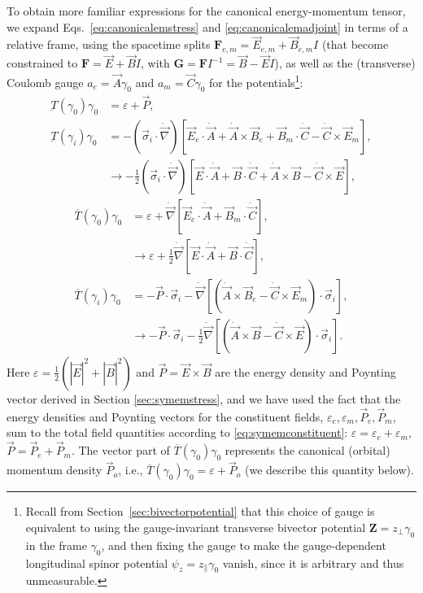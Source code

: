 \documentclass[1p,sort&compress]{elsarticle}
\numberwithin{equation}{section}
\newcommand{\rv}[1]{\vec{#1}}
\newcommand{\bv}[1]{\mathbf{#1}}
\begin{document}
To obtain more familiar expressions for the canonical energy-momentum tensor, we expand Eqs.~\eqref{eq:canonicalemstress} and \eqref{eq:canonicalemadjoint} in terms of a relative frame, using the spacetime splits $\bv{F}_{e,m} = \rv{E}_{e,m} + \rv{B}_{e,m} I$ (that become constrained to $\bv{F} = \rv{E} + \rv{B}I$, with $\bv{G} = \bv{F}I^{-1} = \rv{B} - \rv{E} I$), as well as the (transverse) Coulomb gauge $a_e = \rv{A}\gamma_0$ and $a_m = \rv{C}\gamma_0$ for the potentials\footnote{Recall from Section~\ref{sec:bivectorpotential} that this choice of gauge is equivalent to using the gauge-invariant transverse bivector potential $\bv{Z} = z_\perp\gamma_0$ in the frame $\gamma_0$, and then fixing the gauge to make the gauge-dependent longitudinal spinor potential $\psi_z = z_\parallel\gamma_0$ vanish, since it is arbitrary and thus unmeasurable.}:
\begin{align}\label{eq:emtensorrel}
  \underbar{T}(\gamma_0)\gamma_0 &= \varepsilon + \rv{P}, \\
 \underbar{T}(\gamma_i)\gamma_0 &= -(\rv{\sigma}_i\cdot\dot{\rv{\nabla}})\left[\rv{E}_e\cdot\dot{\rv{A}} + \dot{\rv{A}}\times\rv{B}_e + \rv{B}_m\cdot\dot{\rv{C}} - \dot{\rv{C}}\times\rv{E}_m\right], \nonumber \\
 &\to -\frac{1}{2}(\rv{\sigma}_i\cdot\dot{\rv{\nabla}})\left[\rv{E}\cdot\dot{\rv{A}} + \rv{B}\cdot\dot{\rv{C}} + \dot{\rv{A}}\times\rv{B} - \dot{\rv{C}}\times\rv{E}\right], \nonumber 
\end{align}
\begin{align}\label{eq:emadjointrel}
  \overline{T}(\gamma_0)\gamma_0 &= \varepsilon + \dot{\rv{\nabla}}\left[\rv{E}_e\cdot\dot{\rv{A}} + \rv{B}_m\cdot\dot{\rv{C}}\right], \\
  &\to \varepsilon + \frac{1}{2}\dot{\rv{\nabla}}\left[\rv{E}\cdot\dot{\rv{A}} + \rv{B}\cdot\dot{\rv{C}}\right], \nonumber\\
  \overline{T}(\gamma_i)\gamma_0 &= -\rv{P}\cdot\rv{\sigma}_i - \dot{\rv{\nabla}}\left[(\dot{\rv{A}}\times\rv{B}_e - \dot{\rv{C}}\times\rv{E}_m)\cdot\rv{\sigma}_i\right], \nonumber \\
  &\to -\rv{P}\cdot\rv{\sigma}_i - \frac{1}{2}\dot{\rv{\nabla}}\left[(\dot{\rv{A}}\times\rv{B} - \dot{\rv{C}}\times\rv{E})\cdot\rv{\sigma}_i\right]. \nonumber
\end{align}
Here $\varepsilon = \frac{1}{2}(|\rv{E}|^2 + |\rv{B}|^2)$ and $\rv{P} = \rv{E}\times\rv{B}$ are the energy density and Poynting vector derived in Section \ref{sec:symemstress}, and we have used the fact that the energy densities and Poynting vectors for the constituent fields, $\varepsilon_e,\varepsilon_m,\rv{P}_e,\rv{P}_m$, sum to the total field quantities according to \eqref{eq:symemconstituent}: $\varepsilon = \varepsilon_e + \varepsilon_m$, $\rv{P} = \rv{P}_e + \rv{P}_m$. 
The vector part of $\overline{T}(\gamma_0)\gamma_0$ represents the canonical (orbital) momentum density $\vec{P}_o$, i.e., $\overline{T}(\gamma_0)\gamma_0 = \varepsilon + \vec{P}_o$ (we describe this quantity below).
\end{document}
